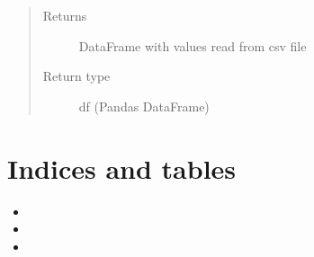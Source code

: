 \documentclass[letterpaper,10pt,english]{sphinxmanual}
\begin{document}
\begin{fulllineitems}
\begin{fulllineitems}
\begin{quote}
\begin{description}
\item[{Returns}] \leavevmode
DataFrame with values read from csv file

\item[{Return type}] \leavevmode
df (Pandas DataFrame)

\end{description}\end{quote}

\end{fulllineitems}


\end{fulllineitems}



\chapter{Indices and tables}
\label{\detokenize{index:indices-and-tables}}\begin{itemize}
\item {} 

\item {} 

\item {} 

\end{itemize}


\renewcommand{\indexname}{Python Module Index}
\begin{sphinxtheindex}
\let\bigletter\sphinxstyleindexlettergroup
\bigletter{k}
\item\relax{}
\end{sphinxtheindex}

\renewcommand{\indexname}{Index}
\printindex
\end{document}
